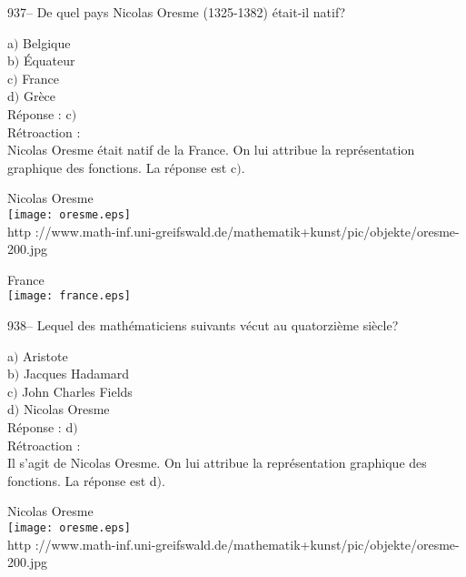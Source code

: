 ﻿\documentclass[letterpaper, 12pt]{article}
\begin{document}
937-- De quel pays Nicolas Oresme (1325-1382) \'etait-il natif?

a$)$ Belgique \\
b$)$ \'Equateur  \\
c$)$ France \\
d$)$ Gr\`ece\\

R\'eponse : c$)$\\

R\'etroaction : \\
Nicolas Oresme \'etait natif de la France. On lui attribue la
repr\'esentation graphique des fonctions. La r\'eponse est c$)$.\\

        \begin{center}
        Nicolas Oresme\\
    \texttt{[image: oresme.eps]}\\
        {\footnotesize http
://www.math-inf.uni-greifswald.de/mathematik+kunst/pic/objekte/oresme-200.jpg}
    \end{center}

        \begin{center}
        France\\
    \texttt{[image: france.eps]}\\
    \end{center}

938-- Lequel des math\'ematiciens suivants v\'ecut au quatorzi\`eme
si\`ecle?

a$)$ Aristote \\
b$)$ Jacques Hadamard \\
c$)$ John Charles Fields \\
d$)$ Nicolas Oresme\\

R\'eponse : d$)$\\

R\'etroaction :\\
Il s'agit de Nicolas Oresme. On lui attribue la repr\'esentation graphique
des fonctions. La r\'eponse est d$)$.\\

        \begin{center}
        Nicolas Oresme\\
    \texttt{[image: oresme.eps]}\\
        {\footnotesize http
://www.math-inf.uni-greifswald.de/mathematik+kunst/pic/objekte/oresme-200.jpg}
    \end{center}
\end{document}
